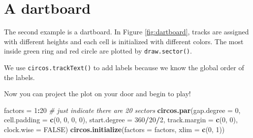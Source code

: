\documentclass[]{book}
\newenvironment{Shaded}{\begin{snugshade}}{\end{snugshade}}
\newcommand{\KeywordTok}[1]{\textcolor[rgb]{0.13,0.29,0.53}{\textbf{#1}}}
\newcommand{\DataTypeTok}[1]{\textcolor[rgb]{0.13,0.29,0.53}{#1}}
\newcommand{\DecValTok}[1]{\textcolor[rgb]{0.00,0.00,0.81}{#1}}
\newcommand{\StringTok}[1]{\textcolor[rgb]{0.31,0.60,0.02}{#1}}
\newcommand{\CommentTok}[1]{\textcolor[rgb]{0.56,0.35,0.01}{\textit{#1}}}
\newcommand{\OtherTok}[1]{\textcolor[rgb]{0.56,0.35,0.01}{#1}}
\newcommand{\OperatorTok}[1]{\textcolor[rgb]{0.81,0.36,0.00}{\textbf{#1}}}
\newcommand{\NormalTok}[1]{#1}
\begin{document}
\section{A dartboard}\label{a-dartboard}

The second example is a dartboard. In Figure \ref{fig:dartboard}, tracks
are assigned with different heights and each cell is initialized with
different colors. The most inside green ring and red circle are plotted
by \texttt{draw.sector()}.

We use \texttt{circos.trackText()} to add labels because we know the
global order of the labels.

Now you can project the plot on your door and begin to play!

\begin{Shaded}
\begin{Highlighting}[]
\NormalTok{factors =}\StringTok{ }\DecValTok{1}\OperatorTok{:}\DecValTok{20}  \CommentTok{# just indicate there are 20 sectors}
\KeywordTok{circos.par}\NormalTok{(}\DataTypeTok{gap.degree =} \DecValTok{0}\NormalTok{, }\DataTypeTok{cell.padding =} \KeywordTok{c}\NormalTok{(}\DecValTok{0}\NormalTok{, }\DecValTok{0}\NormalTok{, }\DecValTok{0}\NormalTok{, }\DecValTok{0}\NormalTok{),}
    \DataTypeTok{start.degree =} \DecValTok{360}\OperatorTok{/}\DecValTok{20}\OperatorTok{/}\DecValTok{2}\NormalTok{, }\DataTypeTok{track.margin =} \KeywordTok{c}\NormalTok{(}\DecValTok{0}\NormalTok{, }\DecValTok{0}\NormalTok{), }\DataTypeTok{clock.wise =} \OtherTok{FALSE}\NormalTok{)}
\KeywordTok{circos.initialize}\NormalTok{(}\DataTypeTok{factors =}\NormalTok{ factors, }\DataTypeTok{xlim =} \KeywordTok{c}\NormalTok{(}\DecValTok{0}\NormalTok{, }\DecValTok{1}\NormalTok{))}


\end{Highlighting}
\end{Shaded}
\end{document}
